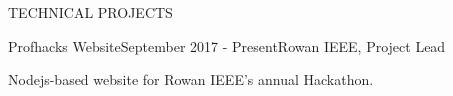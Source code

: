 \documentclass{resume} %
\begin{document}
\begin{rSection}{TECHNICAL PROJECTS}

\begin{rSubsection}{Profhacks Website}{September 2017 - Present}{Rowan IEEE, Project Lead}{}
\item Nodejs-based website for Rowan IEEE's annual Hackathon.
\end{rSubsection}


%









\end{rSection}
\end{document}
